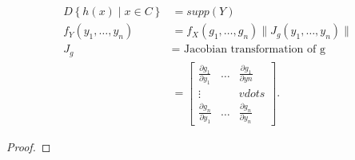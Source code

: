 \begin{theorem}
\begin{align*}
	D\left\{ h\left( x \right)  \mid x \in  C \right\} 
	&= supp\left( Y \right) 
	\\
	f_{Y}\left( y_{1} , \ldots , y_{n} \right) &= f_{X}\left( g_{1} , \ldots , g_{n} \right)  \|J_{g}\left( y_{1} , \ldots , y_{n} \right) \|  \\
	J_{g} &=  \text{ Jacobian transformation of g} \\
	&= \begin{bmatrix} 
	\frac{\partial g_1}{\partial y_1} & \ldots & \frac{\partial g_1}{\partial yn} \\
        \vdots & & vdots \\
\frac{\partial g_{n}}{\partial y_1}  & \ldots & \frac{\partial g_{n}}{\partial y_{n}} \end{bmatrix} 
.\end{align*}
\begin{proof}
\end{proof}
\end{theorem}

